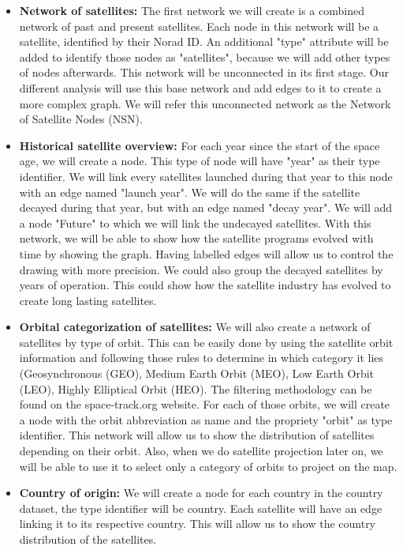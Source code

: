 \documentclass[11pt,letterpaper]{article}
\begin{document}
\begin{itemize}
    \item \textbf{Network of satellites:} The first network we will create is a combined network of past and present satellites.
 Each node in this network will be a satellite, identified by their Norad ID\@.
 An additional "type" attribute will be added to identify those nodes as "satellites", because we will add other types of nodes afterwards.
 This network will be unconnected in its first stage.
 Our different analysis will use this base network and add edges to it to create a more complex graph.
 We will refer this unconnected network as the Network of Satellite Nodes (NSN).


    \item \textbf{Historical satellite overview:} For each year since the start of the space age, we will create a node.
        This type of node will have "year" as their type identifier.
 We will link every satellites launched during that year to this node with an edge named "launch year".
 We will do the same if the satellite decayed during that year, but with an edge named "decay year".
 We will add a node "Future" to which we will link the undecayed satellites.
 With this network, we will be able to show how the satellite programs evolved with time by showing the graph.
 Having labelled edges will allow us to control the drawing with more precision.
 We could also group the decayed satellites by years of operation.
 This could show how the satellite industry has evolved to create long lasting satellites.

    \item \textbf{Orbital categorization of satellites:}  We will also create a network of satellites by type of orbit.
        This can be easily done by using the satellite orbit information and following those rules to determine in which category it lies (Geosynchronous (GEO), Medium Earth Orbit (MEO), Low Earth Orbit (LEO), Highly Elliptical Orbit (HEO). 
        The filtering methodology can be found on the space-track.org website. 
        For each of those orbits, we will create a node with the orbit abbreviation as name and the propriety "orbit" as type identifier.
        This network will allow us to show the distribution of satellites depending on their orbit.
        Also, when we do satellite projection later on, we will be able to use it to select only a category of orbits to project on the map.

    \item \textbf{Country of origin:} We will create a node for each country in the country dataset, the type identifier will be country. 
        Each satellite will have an edge linking it to its respective country.
        This will allow us to show the country distribution of the satellites.


\end{itemize}
\end{document}
